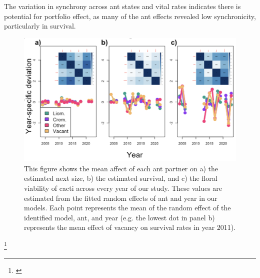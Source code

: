 \documentclass[11pt]{article}
\newcommand{\ali}[2]{{\color{blue}{#1}}\footnote{\textit{\color{blue}{#2}}}}
\begin{document}
The variation in synchrony across ant states and vital rates indicates there is potential for portfolio effect, as many of the ant effects revealed low synchronicity, particularly in survival. 


\begin{figure}[H]
	\includegraphics[width=0.95\linewidth]{Figures/ant_RFX.png}
	\caption{This figure shows the mean affect of each ant partner on a) the estimated next size, b) the estimated survival, and c) the floral viability of cacti across every year of our study. These values are estimated from the fitted random effects of ant and year in our models. Each point represents the mean of the random effect of the identified model, ant, and year (e.g. the lowest dot in panel b) represents the mean effect of vacancy on survival rates in year 2011).}
	\label{fig:Annual_Ant}
\end{figure}
\ali{}{Honestly not sure if I should include an image for this one or just report some values? We should discuss. }
\end{document}

